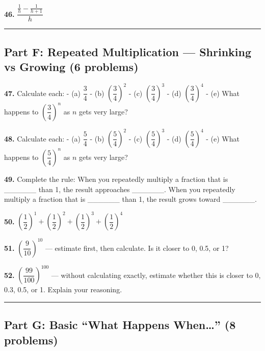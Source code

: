 \documentclass[
  11pt,
]{article}
\begin{document}
\textbf{46.} \(\dfrac{\frac{1}{h} - \frac{1}{h+1}}{h}\)

\begin{center}\rule{0.5\linewidth}{0.5pt}\end{center}

\hypertarget{part-f-repeated-multiplication-shrinking-vs-growing-6-problems}{%
\subsection{Part F: Repeated Multiplication --- Shrinking vs Growing (6
problems)}\label{part-f-repeated-multiplication-shrinking-vs-growing-6-problems}}

\textbf{47.} Calculate each: - (a) \(\dfrac{3}{4}\) - (b)
\(\left(\dfrac{3}{4}\right)^2\) - (c) \(\left(\dfrac{3}{4}\right)^3\) -
(d) \(\left(\dfrac{3}{4}\right)^4\) - (e) What happens to
\(\left(\dfrac{3}{4}\right)^n\) as \(n\) gets very large?

\textbf{48.} Calculate each: - (a) \(\dfrac{5}{4}\) - (b)
\(\left(\dfrac{5}{4}\right)^2\) - (c) \(\left(\dfrac{5}{4}\right)^3\) -
(d) \(\left(\dfrac{5}{4}\right)^4\) - (e) What happens to
\(\left(\dfrac{5}{4}\right)^n\) as \(n\) gets very large?

\textbf{49.} Complete the rule: When you repeatedly multiply a fraction
that is \_\_\_\_\_\_ than 1, the result approaches \_\_\_\_\_\_. When
you repeatedly multiply a fraction that is \_\_\_\_\_\_ than 1, the
result grows toward \_\_\_\_\_\_.

\textbf{50.}
\(\left(\dfrac{1}{2}\right)^1 + \left(\dfrac{1}{2}\right)^2 + \left(\dfrac{1}{2}\right)^3 + \left(\dfrac{1}{2}\right)^4\)

\textbf{51.} \(\left(\dfrac{9}{10}\right)^{10}\) --- estimate first,
then calculate. Is it closer to 0, 0.5, or 1?

\textbf{52.} \(\left(\dfrac{99}{100}\right)^{100}\) --- without
calculating exactly, estimate whether this is closer to 0, 0.3, 0.5, or
1. Explain your reasoning.

\begin{center}\rule{0.5\linewidth}{0.5pt}\end{center}

\hypertarget{part-g-basic-what-happens-when-8-problems}{%
\subsection{\texorpdfstring{Part G: Basic ``What Happens When\ldots{}''
(8
problems)}{Part G: Basic ``What Happens When\ldots'' (8 problems)}}\label{part-g-basic-what-happens-when-8-problems}}
\end{document}
